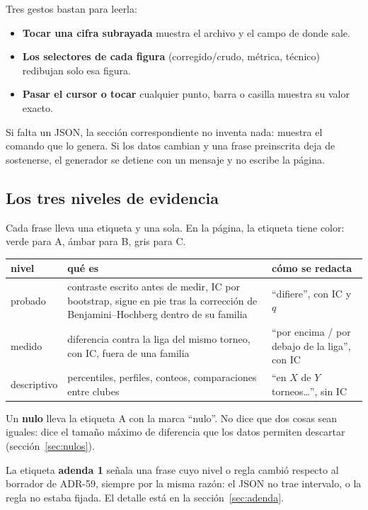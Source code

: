\documentclass[11pt,a4paper]{article}
\newcommand{\nivel}[1]{\fbox{\footnotesize\textbf{#1}}}
\begin{document}
Tres gestos bastan para leerla:
\begin{itemize}
\item \textbf{Tocar una cifra subrayada} muestra el archivo y el campo de donde sale.
\item \textbf{Los selectores de cada figura} (corregido/crudo, métrica, técnico)
  redibujan solo esa figura.
\item \textbf{Pasar el cursor o tocar} cualquier punto, barra o casilla muestra su valor exacto.
\end{itemize}

Si falta un JSON, la sección correspondiente no inventa nada: muestra el
comando que lo genera. Si los datos cambian y una frase preinscrita deja de
sostenerse, el generador se detiene con un mensaje y no escribe la página.

\subsection{Los tres niveles de evidencia}
Cada frase lleva una etiqueta y una sola. En la página, la etiqueta tiene
color: verde para A, ámbar para B, gris para C.

\begin{tabularx}{\linewidth}{@{}lXX@{}}
\toprule
nivel & qué es & cómo se redacta\\
\midrule
\nivel{A} probado & contraste escrito antes de medir, IC por bootstrap, sigue en pie tras la corrección de Benjamini--Hochberg dentro de su familia & ``difiere'', con IC y $q$\\
\nivel{B} medido & diferencia contra la liga del mismo torneo, con IC, fuera de una familia & ``por encima / por debajo de la liga'', con IC\\
\nivel{C} descriptivo & percentiles, perfiles, conteos, comparaciones entre clubes & ``en $X$ de $Y$ torneos\ldots'', sin IC\\
\bottomrule
\end{tabularx}

Un \textbf{nulo} lleva la etiqueta A con la marca ``nulo''. No dice que dos cosas
sean iguales: dice el tamaño máximo de diferencia que los datos permiten
descartar (sección~\ref{sec:nulos}).

La etiqueta \textbf{adenda 1} señala una frase cuyo nivel o regla cambió respecto al
borrador de ADR-59, siempre por la misma razón: el JSON no trae intervalo, o la
regla no estaba fijada. El detalle está en la sección~\ref{sec:adenda}.

\end{document}
